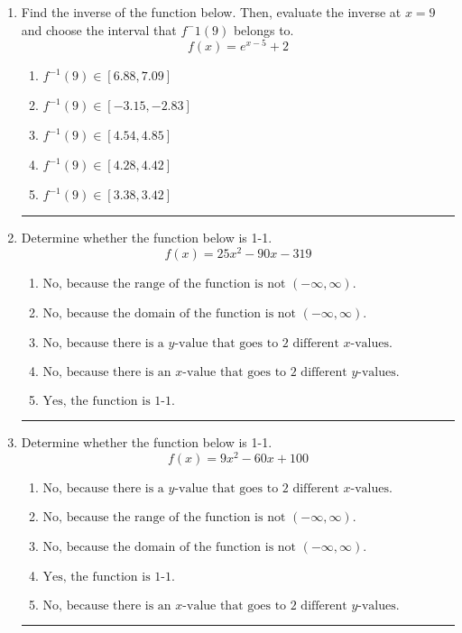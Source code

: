 \documentclass[14pt]{extbook}
\newcommand{\litem}[1]{\item#1\hspace*{-1cm}\rule{\textwidth}{0.4pt}}
\begin{document}
\begin{enumerate}
{\begin{enumerate}[label=\Alph*.]
\end{enumerate} }
\litem{
Find the inverse of the function below. Then, evaluate the inverse at $x = 9$ and choose the interval that $f^-1(9)$ belongs to.\[ f(x) = e^{x-5}+2 \]\begin{enumerate}[label=\Alph*.]
\item \( f^{-1}(9) \in [6.88, 7.09] \)
\item \( f^{-1}(9) \in [-3.15, -2.83] \)
\item \( f^{-1}(9) \in [4.54, 4.85] \)
\item \( f^{-1}(9) \in [4.28, 4.42] \)
\item \( f^{-1}(9) \in [3.38, 3.42] \)

\end{enumerate} }
\litem{
Determine whether the function below is 1-1.\[ f(x) = 25 x^2 - 90 x - 319 \]\begin{enumerate}[label=\Alph*.]
\item \( \text{No, because the range of the function is not $(-\infty, \infty)$.} \)
\item \( \text{No, because the domain of the function is not $(-\infty, \infty)$.} \)
\item \( \text{No, because there is a $y$-value that goes to 2 different $x$-values.} \)
\item \( \text{No, because there is an $x$-value that goes to 2 different $y$-values.} \)
\item \( \text{Yes, the function is 1-1.} \)

\end{enumerate} }
\litem{
Determine whether the function below is 1-1.\[ f(x) = 9 x^2 - 60 x + 100 \]\begin{enumerate}[label=\Alph*.]
\item \( \text{No, because there is a $y$-value that goes to 2 different $x$-values.} \)
\item \( \text{No, because the range of the function is not $(-\infty, \infty)$.} \)
\item \( \text{No, because the domain of the function is not $(-\infty, \infty)$.} \)
\item \( \text{Yes, the function is 1-1.} \)
\item \( \text{No, because there is an $x$-value that goes to 2 different $y$-values.} \)


\end{enumerate}}
\end{enumerate}
\end{document}
